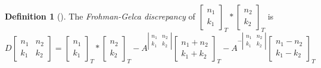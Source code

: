 \documentclass{article}
\newcommand{\twos}[2]{\left[\begin{smallmatrix}#1\\#2\end{smallmatrix}\right]}
\newcommand{\two}[2]{\begin{bmatrix}#1\\#2\end{bmatrix}}
\theoremstyle{definition}
\newtheorem{definition}[theorem]{Definition}
\begin{document}
\begin{definition}[]
    The \textit{Frohman-Gelca discrepancy} of $\twos{n_1}{k_1}_T* \twos{n_2}{k_2}_T$ is
    \[
    D\begin{bmatrix}
        n_1&n_2\\
        k_1&k_2
    \end{bmatrix}=\two{n_1}{k_1}_T* \two{n_2}{k_2}_T-A^{\left|\begin{smallmatrix}
        n_1&n_2\\
        k_1&k_2
    \end{smallmatrix}\right|}\two{n_1+n_2}{k_1+k_2}_T-A^{-\left|\begin{smallmatrix}
        n_1&n_2\\
        k_1&k_2
    \end{smallmatrix}\right|}\two{n_1-n_2}{k_1-k_2}_T
    \]
\end{definition}
\end{document}
